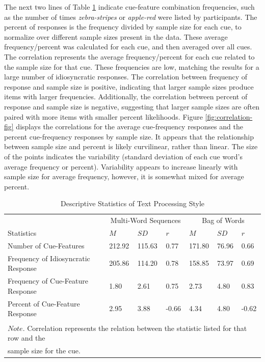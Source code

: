 \documentclass[man]{apa6}
\begin{document}
The next two lines of Table \ref{tab:tab6} indicate cue-feature combination frequencies, such as the number of times \emph{zebra-stripes} or \emph{apple-red} were listed by participants. The percent of responses is the frequency divided by sample size for each cue, to normalize over different sample sizes present in the data. These average frequency/percent was calculated for each cue, and then averaged over all cues. The correlation represents the average frequency/percent for each cue related to the sample size for that cue. These frequencies are low, matching the results for a large number of idiosyncratic responses. The correlation between frequency of response and sample size is positive, indicating that larger sample sizes produce items with larger frequencies. Additionally, the correlation between percent of response and sample size is negative, suggesting that larger sample sizes are often paired with more items with smaller percent likelihoods. Figure \ref{fig:correlation-fig} displays the correlations for the average cue-frequency responses and the percent cue-frequency responses by sample size. It appears that the relationship between sample size and percent is likely curvilinear, rather than linear. The size of the points indicates the variability (standard deviation of each cue word's average frequency or percent). Variability appears to increase linearly with sample size for average frequency, however, it is somewhat mixed for average percent.

\begin{table}[t]

\caption{\label{tab:tab6}Descriptive Statistics of Text Processing Style}
\centering
\begin{tabular}{lllllll}
\toprule
\multicolumn{1}{c}{ } & \multicolumn{3}{c}{Multi-Word Sequences} & \multicolumn{3}{c}{Bag of Words} \\
\cmidrule(l{3pt}r{3pt}){2-4} \cmidrule(l{3pt}r{3pt}){5-7}
Statistics & $M$ & $SD$ & $r$ & $M$ & $SD$ & $r$\\
\midrule
Number of Cue-Features & 212.92 & 115.63 & 0.77 & 171.80 & 76.96 & 0.66\\
Frequency of Idiosyncratic Response & 205.86 & 114.20 & 0.78 & 158.85 & 73.97 & 0.69\\
Frequency of Cue-Feature Response & 1.80 & 2.61 & 0.75 & 2.73 & 4.80 & 0.83\\
Percent of Cue-Feature Response & 2.95 & 3.88 & -0.66 & 4.34 & 4.80 & -0.62\\
\bottomrule
\multicolumn{7}{l}{\textsuperscript{} $Note$. Correlation represents the relation between the statistic listed for that row and the}\\
\multicolumn{7}{l}{sample size for the cue.}\\
\end{tabular}
\end{table}
\end{document}
